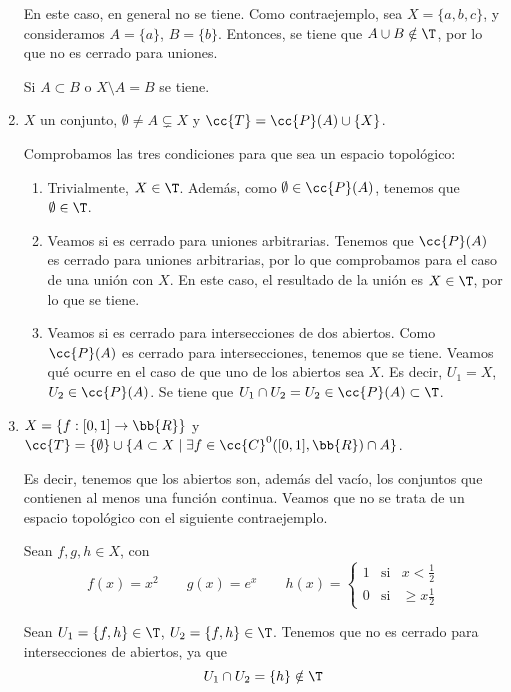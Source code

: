 \begin{ejercicio}
\begin{enumerate}[label=\alph*)]
        En este caso, en general no se tiene. Como contraejemplo, sea $X=\{a,b,c\}$, y consideramos $A=\{a\}$, $B=\{b\}$. Entonces, se tiene que $A\cup B\notin \T$, por lo que no es cerrado para uniones.

        Si $A\subset B$ o $X\setminus A=B$ se tiene.

        \item $X$ un conjunto, $\emptyset\neq A \subsetneq X$ y $\cc{T}=\cc{P}(A)\cup \{X\}$.

        Comprobamos las tres condiciones para que sea un espacio topológico:
        \begin{enumerate}
            \item Trivialmente, $X\in \T$. Además, como $\emptyset\in \cc{P}(A)$, tenemos que $\emptyset\in \T$.
            \item Veamos si es cerrado para uniones arbitrarias. Tenemos que $\cc{P}(A)$ es cerrado para uniones arbitrarias, por lo que comprobamos para el caso de una unión con $X$. En este caso, el resultado de la unión es $X\in \T$, por lo que se tiene.

            \item Veamos si es cerrado para intersecciones de dos abiertos. Como $\cc{P}(A)$ es cerrado para intersecciones, tenemos que se tiene. Veamos qué ocurre en el caso de que uno de los abiertos sea $X$. Es decir, $U_1=X$, $U_2\in \cc{P}(A)$. Se tiene que $U_1\cap U_2=U_2\in \cc{P}(A)\subset \T$.
        \end{enumerate}

        \item $X=\{f:[0,1]\to \bb{R}\}$ y $\cc{T}=\{\emptyset\}\cup \{A\subset X\mid \exists f\in \cc{C}^0([0,1],\bb{R})\cap A\}$.

        Es decir, tenemos que los abiertos son, además del vacío, los conjuntos que contienen al menos una función continua. Veamos que no se trata de un espacio topológico con el siguiente contraejemplo.

        Sean $f,g,h\in X$, con
        $$f(x)=x^2 \qquad g(x)=e^x \qquad h(x)=\left\{\begin{array}{ccc}
            1 & \text{si} & x<\frac{1}{2} \\
            0 & \text{si} & \geq x\frac{1}{2}
        \end{array}\right.$$

        Sean $U_1=\{f,h\}\in \T$, $U_2=\{f,h\}\in \T$. Tenemos que no es cerrado para intersecciones de abiertos, ya que
        $$U_1\cap U_2 = \{h\}\notin \T$$
    \end{enumerate}
\end{ejercicio}



